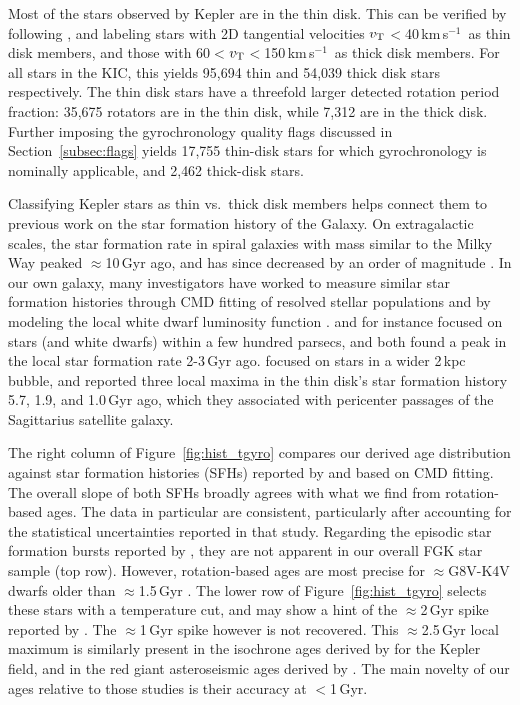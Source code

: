 \documentclass[11pt,twocolumn,tighten]{aastex63}
\newcommand{\kms}{{km\,s$^{-1}$}}
\begin{document}
Most of the stars observed by Kepler are in the thin disk.  This can
be verified by following \citet{Gaia_2018}, and labeling stars with 2D
tangential velocities $v_{\rm T}$$<$40\,\kms\ as thin disk members,
and those with 60$<$$v_{\rm T}$$<$150\,\kms\ as thick disk members.
For all stars in the KIC, this yields 95{,}694 thin and 54{,}039 thick
disk stars respectively.  The thin disk stars have a threefold larger
detected rotation period fraction: 35{,}675 rotators are in the thin
disk, while 7{,}312 are in the thick disk.  Further imposing the
gyrochronology quality flags discussed in Section~\ref{subsec:flags}
yields 17{,}755 thin-disk stars for which gyrochronology is nominally
applicable, and 2{,}462 thick-disk stars.

Classifying Kepler stars as thin vs.\ thick disk members helps connect
them to previous work on the star formation history of the Galaxy.  On
extragalactic scales, the star formation rate in spiral galaxies with
mass similar to the Milky Way peaked $\approx$10\,Gyr ago, and has
since decreased by an order of magnitude
\citep[e.g.][]{2004Natur.428..625H,2006ApJ...651..142H}.  In our own
galaxy, many investigators have worked to measure similar star
formation histories through CMD fitting of resolved stellar
populations
\citep[][]{2019A&A...624L...1M,2020NatAs...4..965R,2021MNRAS.501..302A,2022Natur.603..599X}
and by modeling the local white dwarf luminosity function
\citep[e.g.][]{2019ApJ...878L..11I}.  \citet{2019A&A...624L...1M} and
\citet{2019ApJ...878L..11I} for instance focused on stars (and white
dwarfs) within a few hundred parsecs, and both found a peak in the
local star formation rate 2-3\,Gyr ago.  \citet{2020NatAs...4..965R}
focused on stars in a wider 2\,kpc bubble, and reported three local
maxima in the thin disk's star formation history 5.7, 1.9, and
1.0\,Gyr ago, which they associated with pericenter passages of the
Sagittarius satellite galaxy.

The right column of Figure~\ref{fig:hist_tgyro} compares our derived
age distribution against star formation histories (SFHs) reported by
\citet{2019A&A...624L...1M} and \citet{2020NatAs...4..965R} based on
CMD fitting.  The overall slope of both SFHs broadly agrees with what
we find from rotation-based ages.  The \citet{2019A&A...624L...1M}
data in particular are consistent, particularly after accounting for
the statistical uncertainties reported in that study.  Regarding the
episodic star formation bursts reported by
\citet{2020NatAs...4..965R}, they are not apparent in our overall FGK
star sample (top row).  However, rotation-based ages are most precise
for $\approx$G8V-K4V dwarfs older than $\approx$1.5\,Gyr
\citep{Bouma_2023}.  The lower row of Figure~\ref{fig:hist_tgyro}
selects these stars with a temperature cut, and may show a hint of the
$\approx$2\,Gyr spike reported by \citet{2020NatAs...4..965R}.  The
$\approx$1\,Gyr spike however is not recovered.  This
$\approx$2.5\,Gyr local maximum is similarly present in the isochrone
ages derived by \citet{Berger_2020a_catalog} for the Kepler field, and
in the red giant asteroseismic ages derived by
\citet{SilvaAguirre2018}.  The main novelty of our ages relative to
those studies is their accuracy at $<$1\,Gyr.
\end{document}
